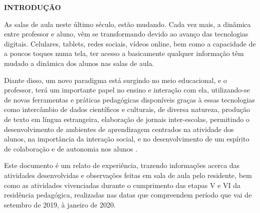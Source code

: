 \begin{OnehalfSpace}

    \noindent\textbf{INTRODUÇÃO}

    As salas de aula neste último século, estão mudando. Cada vez mais, a dinâmica entre professor e aluno, vêm se transformando devido ao avanço das tecnologias digitais. Celulares, tablets, redes sociais, vídeos online, bem como a capacidade de a poucos toques numa tela, ter acesso a basicamente qualquer informação têm mudado a dinâmica dos alunos nas salas de aula.
    
    Diante disso, um novo paradigma está surgindo no meio educacional, e o professor, terá um importante papel no ensino e interação com ela, utilizando-se de novas ferramentas e práticas pedagógicas disponíveis graças à essas tecnologias como intercâmbio de dados científicos e culturais, de diversa natureza, produção de texto em língua estrangeira, elaboração de jornais inter-escolas, permitindo o desenvolvimento de ambientes de aprendizagem centrados na atividade dos alunos, na importância da interação social, e no desenvolvimento de um espírito de colaboração e de autonomia nos alunos \cite{machado2002}.
    
    Este documento é um relato de experiência, trazendo informações acerca das atividades desenvolvidas e observações feitas em sala de aula pelo residente, bem como as atividades vivenciadas durante o cumprimento das etapas V e VI da residência pedagógica, realizadas nas datas que compreendem período que vai de setembro de 2019, à janeiro de 2020. 

\end{OnehalfSpace}